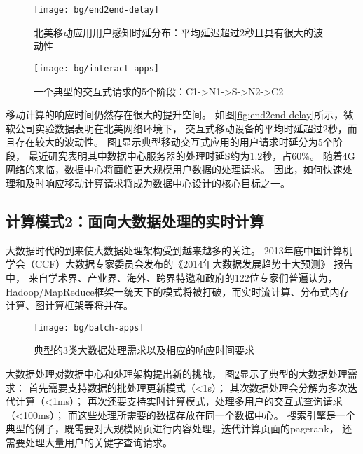 \begin{figure}
\begin{minipage}{0.48\textwidth}
  \centering
  \texttt{[image: bg/end2end-delay]}
  \caption[北美移动应用用户感知时延分布]{北美移动应用用户感知时延分布：平均延迟超过2秒且具有很大的波动性}
  \label{fig:end2end-delay}
\end{minipage}\hfill
\begin{minipage}{0.48\textwidth}
  \centering
  \texttt{[image: bg/interact-apps]}
  \caption[一个典型的交互式请求的5个阶段]{一个典型的交互式请求的5个阶段：C1->N1->S->N2->C2 \cite{timecard:2013}}
  \label{fig:interact-apps}
\end{minipage}
\end{figure}

移动计算的响应时间仍然存在很大的提升空间。
如图\ref{fig:end2end-delay}所示，微软公司实验数据表明在北美网络环境下，
交互式移动设备的平均时延超过2秒，而且存在较大的波动性。
图\ref{fig:interact-apps}显示典型移动交互式应用的用户请求时延分为5个阶段，
最近研究\cite{timecard2013}表明其中数据中心服务器的处理时延S约为1.2秒，占60\%。
随着4G网络的来临，数据中心将面临更大规模用户数据的处理请求。
因此，如何快速处理和及时响应移动计算请求将成为数据中心设计的核心目标之一。


\subsection*{计算模式2：面向大数据处理的实时计算}

大数据时代的到来使大数据处理架构受到越来越多的关注。
2013年底中国计算机学会（CCF）大数据专家委员会发布的《2014年大数据发展趋势十大预测》 报告中，
来自学术界、产业界、海外、跨界特邀和政府的122位专家们普遍认为，
Hadoop/MapReduce框架一统天下的模式将被打破，而实时流计算、分布式内存计算、图计算框架等将并存。

\begin{figure}[H]
  \centering
  \texttt{[image: bg/batch-apps]}
  \caption{典型的3类大数据处理需求以及相应的响应时间要求}
  \label{fig:batch-apps}
\end{figure}


大数据处理对数据中心和处理架构提出新的挑战，
图\ref{fig:batch-apps}显示了典型的大数据处理需求：
首先需要支持数据的批处理更新模式（<1s）；
其次数据处理会分解为多次迭代计算（<1ms）；
再次还要支持实时计算模式，处理多用户的交互式查询请求（<100ms）；
而这些处理所需要的数据存放在同一个数据中心。
搜索引擎是一个典型的例子，既需要对大规模网页进行内容处理，迭代计算页面的pagerank，
还需要处理大量用户的关键字查询请求。

